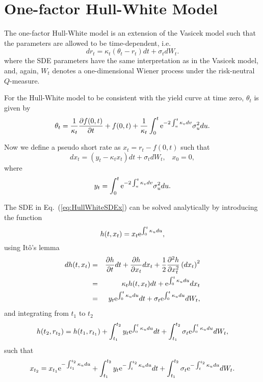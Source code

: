\section{One-factor Hull-White Model}
The one-factor Hull-White model \cite{Hull1990} is an extension of the Vasicek model such that the parameters are allowed to be time-dependent, i.e.
\begin{equation}
dr_t = \kappa_t \left( \theta_t - r_t \right) dt + \sigma_t dW_t.
\end{equation}
where the SDE parameters have the same interpretation as in the Vasicek model, and, again, $W_t$ denotes a one-dimensional Wiener process under the risk-neutral $Q$-measure.

For the Hull-White model to be consistent with the yield curve at time zero, $\theta_t$ is given by \cite{Andersen2010}
\begin{equation}
\theta_t = \frac{1}{\kappa_t} \frac{\partial f(0,t)}{\partial t} + f(0,t) + \frac{1}{\kappa_t} \int_0^t \text{e}^{-2\int_u^t \kappa_v dv} \sigma_u^2 du.
\end{equation}

Now we define a pseudo short rate as $x_t = r_t - f(0,t)$ such that
\begin{equation}
dx_t = \left( y_t - \kappa_t x_t \right) dt + \sigma_t dW_t, \;\;\; x_0 = 0,
\label{eq:HullWhiteSDEx}
\end{equation}
where
\begin{equation}
y_t = \int_0^t \text{e}^{-2\int_u^t \kappa_v dv} \sigma_u^2 du.
\end{equation}

The SDE in Eq.~(\ref{eq:HullWhiteSDEx}) can be solved analytically by introducing the function
\begin{equation}
h(t, x_t) = x_t \text{e}^{\int_0^t \kappa_u du},
\end{equation}
using It\^{o}'s lemma
\begin{eqnarray}
dh(t, x_t) &=& \frac{\partial h}{\partial t} dt + \frac{\partial h}{\partial x_t} dx_t + \frac{1}{2}\frac{\partial^2 h}{\partial x_t^2} \left(dx_t\right)^2 \\
&=& \kappa_t h(t, x_t) dt + \text{e}^{\int_0^t \kappa_u du} dx_t \\
&=& y_t \text{e}^{\int_0^t \kappa_u du} dt + \sigma_t \text{e}^{\int_0^t \kappa_u du} dW_t,
\end{eqnarray}
and integrating from $t_1$ to $t_2$
\begin{equation}
h(t_2, r_{t_2}) = h(t_1, r_{t_1}) + \int_{t_1}^{t_2} y_t \text{e}^{\int_0^t \kappa_u du} dt + \int_{t_1}^{t_2} \sigma_t \text{e}^{\int_0^t \kappa_u du} dW_t,
\end{equation}
such that
\begin{equation}
x_{t_2} = x_{t_1} \text{e}^{-\int_{t_1}^{t_2} \kappa_u du}  + \int_{t_1}^{t_2} y_t \text{e}^{-\int_t^{t_2} \kappa_u du} dt + \int_{t_1}^{t_2} \sigma_t \text{e}^{-\int_t^{t_2} \kappa_u du} dW_t.
\end{equation}

